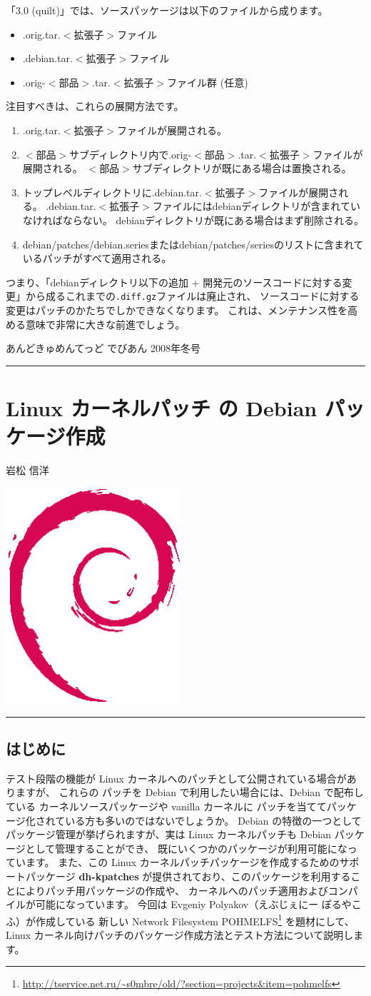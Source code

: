 \documentclass[mingoth,a4paper]{jsarticle}
\renewcommand{\dancersection}[2]{%
\newpage
あんどきゅめんてっど でびあん 2008年冬号
%
\vspace{0.1mm}\\
{\color{dancerlightblue}\rule{\hsize}{2mm}}

%
%
\begin{minipage}[t]{0.6\hsize}
\color{dancerdarkblue}
\vspace{1cm}
\section{#1}
\hfill{}#2\\
\end{minipage}
\begin{minipage}[t]{0.4\hsize}
\vspace{-2cm}
\hfill{}\includegraphics[height=8cm]{image200502/openlogo-nd.eps}\\
\vspace{-5cm}
\end{minipage}
%
%
{\color{dancerdarkblue}\rule{0.74\hsize}{2mm}}
%
\vspace{2cm}
}
\begin{document}
\begin{screen}
「3.0 (quilt)」では、ソースパッケージは以下のファイルから成ります。

\begin{itemize}
 \item .orig.tar.$<$拡張子$>$ファイル
 \item .debian.tar.$<$拡張子$>$ファイル
 \item .orig-$<$部品$>$.tar.$<$拡張子$>$ファイル群 (任意)
\end{itemize}

注目すべきは、これらの展開方法です。

\begin{enumerate}
 \item .orig.tar.$<$拡張子$>$ファイルが展開される。
 \item $<$部品$>$サブディレクトリ内で.orig-$<$部品$>$.tar.$<$拡張子$>$ファイルが展開される。
    $<$部品$>$サブディレクトリが既にある場合は置換される。
 \item トップレベルディレクトリに.debian.tar.$<$拡張子$>$ファイルが展開される。
    .debian.tar.$<$拡張子$>$ファイルにはdebianディレクトリが含まれていなければならない。
    debianディレクトリが既にある場合はまず削除される。
 \item debian/patches/debian.seriesまたはdebian/patches/seriesのリストに含まれているパッチがすべて適用される。
\end{enumerate}

つまり、「debianディレクトリ以下の追加 + 開発元のソースコードに対する変更」から成るこれまでの\texttt{.diff.gz}ファイルは廃止され、
ソースコードに対する変更はパッチのかたちでしかできなくなります。
これは、メンテナンス性を高める意味で非常に大きな前進でしょう。
\end{screen}



\dancersection{Linux カーネルパッチ の Debian パッケージ作成}{岩松 信洋}
\label{sec:kpatch}
 
\subsection{はじめに}
テスト段階の機能が Linux カーネルへのパッチとして公開されている場合がありますが、
これらの パッチを Debian で利用したい場合には、Debian で配布している カーネルソースパッケージや vanilla カーネルに
パッチを当ててパッケージ化されている方も多いのではないでしょうか。
Debian の特徴の一つとしてパッケージ管理が挙げられますが、実は Linux カーネルパッチも Debian パッケージとして管理することができ、
既にいくつかのパッケージが利用可能になっています。
また、この Linux カーネルパッチパッケージを作成するためのサポートパッケージ {\bf dh-kpatches} 
が提供されており、このパッケージを利用することによりパッチ用パッケージの作成や、
カーネルへのパッチ適用およびコンパイルが可能になっています。
今回は Evgeniy Polyakov（えぶじぇにー ぽるやこふ）が作成している
新しい Network Filesystem POHMELFS\footnote{\url{http://tservice.net.ru/~s0mbre/old/?section=projects&item=pohmelfs}}
を題材にして、Linux カーネル向けパッチのパッケージ作成方法とテスト方法について説明します。
  
\end{document}

